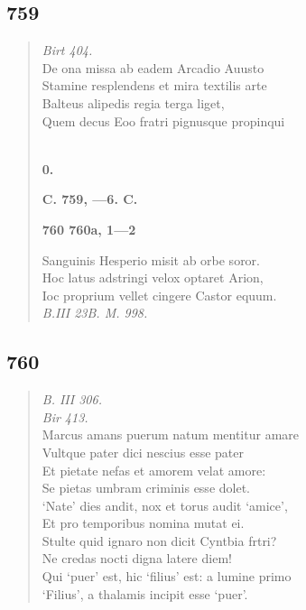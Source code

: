 \documentclass[11pt, a4paper]{report}
\begin{document}
            \subsection*{759}
      \begin{verse}
      \textit{Birt 404.} \\ De ona missa ab eadem Arcadio Auusto \\ Stamine resplendens et mira textilis arte \\ Balteus alipedis regia terga liget, \\ Quem decus Eoo fratri pignusque propinqui \\ 
        ﻿\pagebreak 
    \begin{center} \textbf{0.} \end{center}\begin{center} \textbf{C. 759, —6. C.} \end{center}\begin{center} \textbf{760 760a, 1—2} \end{center}Sanguinis Hesperio misit ab orbe soror. \\ Hoc latus adstringi velox optaret Arion, \\ Ioc proprium vellet cingere Castor equum. \\ \textit{B.III 23B. M. 998.} \\ 
      \end{verse}
  
            \subsection*{760}
      \begin{verse}
      \textit{B. III 306.} \\ \textit{Bir 413.} \\ Marcus amans puerum natum mentitur amare \\ Vultque pater dici nescius esse pater \\ Et pietate nefas et amorem velat amore: \\ Se pietas umbram criminis esse dolet. \\ ‘Nate’ dies andit, nox et torus audit ‘amice’, \\ Et pro temporibus nomina mutat ei. \\ Stulte quid ignaro non dicit Cyntbia frtri? \\ Ne credas nocti digna latere diem! \\ Qui ‘puer’ est, hic ‘filius’ est: a lumine primo \\ ‘Filius’, a thalamis incipit esse ‘puer’. \\ 
      \end{verse}
  
\end{document}
